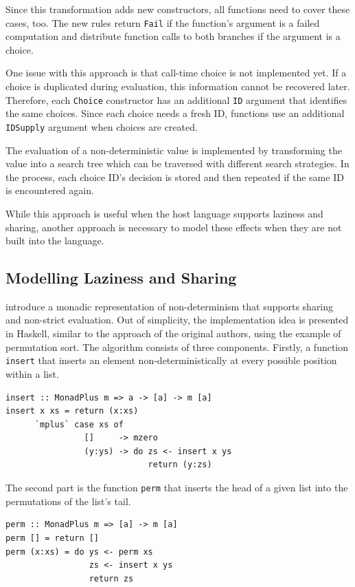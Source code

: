 \documentclass[a4paper, 11pt, fleqn, twoside]{scrreprt}
\newcommand{\hinl}[1]{\texttt{#1}}
\begin{document}
Since this transformation adds new constructors, all functions need to cover these cases, too.
The new rules return \hinl{Fail} if the function's argument is a failed computation and distribute function calls to both branches if the argument is a choice.

One issue with this approach is that call-time choice is not implemented yet.
If a choice is duplicated during evaluation, this information cannot be recovered later.
Therefore, each \hinl{Choice} constructor has an additional \hinl{ID} argument that identifies the same choices.
Since each choice needs a fresh ID, functions use an additional \hinl{IDSupply} argument when choices are created.

The evaluation of a non-deterministic value is implemented by transforming the value into a search tree which can be traversed with different search strategies.
In the process, each choice ID's decision is stored and then repeated if the same ID is encountered again.

While this approach is useful when the host language supports laziness and sharing, another approach is necessary to model these effects when they are not built into the language.

\subsection{Modelling Laziness and Sharing}
\label{subsec:monadicLifting}
\citet{fischer2009purely} introduce a monadic representation of non-determinism that supports sharing and non-strict evaluation.
Out of simplicity, the implementation idea is presented in Haskell, similar to the approach of the original authors, using the example of permutation sort.
The algorithm consists  of three components.
Firstly, a function \hinl{insert} that inserts an element non-deterministically at every possible position within a list.

\begin{verbatim}
insert :: MonadPlus m => a -> [a] -> m [a]
insert x xs = return (x:xs)
      `mplus` case xs of
                []     -> mzero
                (y:ys) -> do zs <- insert x ys
                             return (y:zs)
\end{verbatim}

The second part is the function \hinl{perm} that inserts the head of a given list into the permutations of the list's tail.

\begin{verbatim}
perm :: MonadPlus m => [a] -> m [a]
perm [] = return []
perm (x:xs) = do ys <- perm xs
                 zs <- insert x ys
                 return zs
\end{verbatim}
\end{document}
